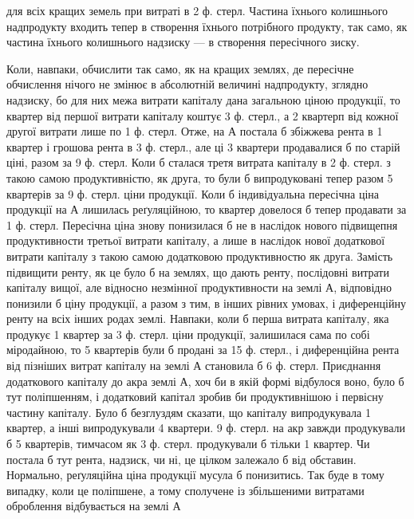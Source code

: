 \parcont{}  %
для всіх кращих земель при витраті в 2  ф. стерл. Частина їхнього колишнього
надпродукту входить тепер в створення їхнього потрібного продукту, так
само, як частина їхнього колишнього надзиску — в створення пересічного зиску.

Коли, навпаки, обчислити так само, як на кращих землях, де пересічне обчислення
нічого не змінює в абсолютній величині надпродукту, зглядно надзиску, бо для
них межа витрати капіталу дана загальною ціною продукції, то квартер від першої
витрати капіталу коштує 3 ф. стерл., а 2 квартерп від кожної другої витрати
лише по 1 ф. стерл. Отже, на $А$ постала б збіжжева рента в 1 квартер
і грошова рента в 3 ф. стерл., але ці 3 квартери продавалися б по старій
ціні, разом за 9 ф. стерл. Коли б сталася третя витрата капіталу в 2  ф.
стерл. з такою самою продуктивністю, як друга, то були б випродуковані тепер
разом 5 квартерів за 9 ф. стерл. ціни продукції. Коли б індивідуальна
пересічна ціна продукції на $А$ лишилась реґуляційною, то квартер довелося б
тепер продавати за 1  ф. стерл. Пересічна ціна знову понизилася б не в
наслідок нового підвищепня продуктивности третьої витрати капіталу, а лише в
наслідок нової додаткової витрати капіталу з такою самою додатковою продуктивностю
як друга. Замість підвищити ренту, як це було б на землях, що дають
ренту, послідовні витрати капіталу вищої, але відносно незмінної продуктивности
на землі $А$, відповідно понизили б ціну продукції, а разом з тим, в інших
рівних умовах, і диференційну ренту на всіх інших родах землі. Навпаки,
коли б перша витрата капіталу, яка продукує 1 квартер за 3 ф. стерл. ціни
продукції, залишилася сама по собі міродайною, то 5 квартерів були б продані
за 15 ф. стерл., і диференційна рента від пізніших витрат капіталу на землі
$А$ становила б 6 ф. стерл. Приєднання додаткового капіталу до акра землі $А$,
хоч би в якій формі відбулося воно, було б тут поліпшенням, і додатковий
капітал зробив би продуктивнішою і первісну частину капіталу. Було б безглуздям
сказати, що   капіталу випродукувала 1 квартер, а інші  випродукували
4 квартери. 9 ф. стерл. на акр завжди продукували б 5 квартерів, тимчасом
як 3 ф. стерл. продукували б тільки 1 квартер. Чи постала б тут рента, надзиск,
чи ні, це цілком залежало б від обставин. Нормально, реґуляційна ціна
продукції мусула б понизитись. Так буде в тому випадку, коли це поліпшене,
а тому сполучене із збільшеними витратами оброблення відбувається на землі $А$
